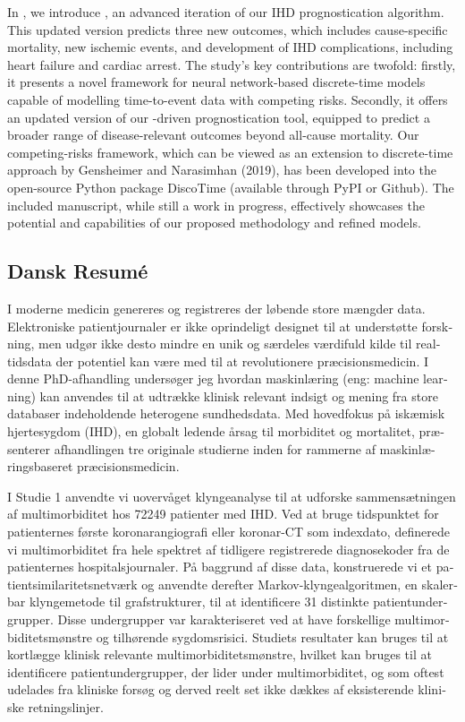 \begin{@empty}
In \studyiii{}, 
we introduce , an advanced iteration of our 
\ac{IHD} prognostication algorithm.
This updated version predicts three new outcomes,
which includes cause-specific mortality,
new ischemic events, and development of 
\ac{IHD} complications, including heart failure and 
cardiac arrest.
The study's key contributions are twofold: 
firstly, it presents a novel framework for neural network-based discrete-time 
models capable of modelling time-to-event data with competing risks. 
Secondly, it offers an updated version
of our -driven prognostication tool, 
equipped to predict a broader range of disease-relevant outcomes 
beyond all-cause mortality. 
Our competing-risks framework,
which can be viewed as an extension to discrete-time approach by 
Gensheimer and Narasimhan (2019), 
has been developed into the open-source Python package \textsf{DiscoTime}
(available through PyPI or Github). 
The included manuscript, while still a work in progress, 
effectively showcases the potential and capabilities 
of our proposed methodology and refined models.

\begin{otherlanguage}{danish}
\chapter*{Dansk Resumé}

I moderne medicin genereres og registreres der løbende store mængder data.
Elektroniske patientjournaler 
er ikke oprindeligt designet til at understøtte forskning,
men udgør ikke desto mindre en unik og særdeles værdifuld kilde til
realtidsdata der potentiel kan være med til at revolutionere præcisionsmedicin.
I denne PhD-afhandling undersøger jeg hvordan maskinlæring 
(eng: machine learning) kan anvendes til at 
udtrække klinisk relevant indsigt og mening
fra store databaser indeholdende heterogene sundhedsdata. 
Med hovedfokus på iskæmisk hjertesygdom (IHD),
en globalt ledende årsag til morbiditet og mortalitet, 
præsenterer afhandlingen tre originale studierne
inden for rammerne af maskinlæringsbaseret præcisionsmedicin.

I Studie 1 anvendte vi uovervåget klyngeanalyse til at udforske 
sammensætningen af multimorbiditet hos \num{72249} patienter med IHD. 
Ved at bruge tidspunktet for patienternes første koronarangiografi eller 
koronar-CT som indexdato, 
definerede vi multimorbiditet fra hele spektret af tidligere 
registrerede diagnosekoder fra de patienternes hospitalsjournaler. 
På baggrund af disse data, konstruerede vi et patientsimilaritetsnetværk 
og anvendte derefter Markov-klyngealgoritmen, 
en skalerbar klyngemetode til grafstrukturer, 
til at identificere 31 distinkte patientundergrupper. 
Disse undergrupper var karakteriseret ved at have forskellige 
multimorbiditetsmønstre og tilhørende sygdomsrisici.
Studiets resultater kan bruges til at kortlægge klinisk relevante 
multimorbiditetsmønstre, hvilket kan bruges til at identificere 
patientundergrupper, der lider under multimorbiditet,
og som oftest udelades fra kliniske forsøg og derved reelt 
set ikke dækkes af eksisterende kliniske retningslinjer.



\end{otherlanguage}
\end{@empty}

